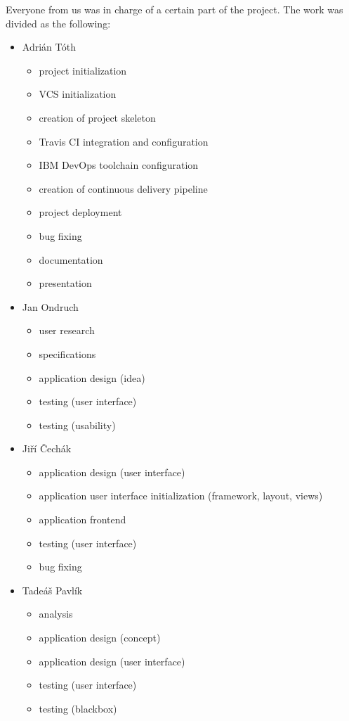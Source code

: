 \documentclass[11pt,a4paper]{article}
\begin{document}
Everyone from us was in charge of a certain part of the project. The work was divided as the following:
\begin{itemize}
    \item Adrián Tóth
    \begin{itemize}
        \item project initialization
        \item VCS initialization
        \item creation of project skeleton
        \item Travis CI integration and configuration
        \item IBM DevOps toolchain configuration
        \item creation of continuous delivery pipeline
        \item project deployment
        \item bug fixing
        \item documentation
        \item presentation
    \end{itemize}

    \item Jan Ondruch
    \begin{itemize}
        \item user research
        \item specifications
        \item application design (idea)
        \item testing (user interface)
        \item testing (usability)
    \end{itemize}

    \item Jiří Čechák
    \begin{itemize}
        \item application design (user interface)
        \item application user interface initialization (framework, layout, views)
        \item application frontend
        \item testing (user interface)
        \item bug fixing
    \end{itemize}

    \item Tadeáš Pavlík
    \begin{itemize}
        \item analysis
        \item application design (concept)
        \item application design (user interface)
        \item testing (user interface)
        \item testing (blackbox)
    \end{itemize}


\end{itemize}
\end{document}
